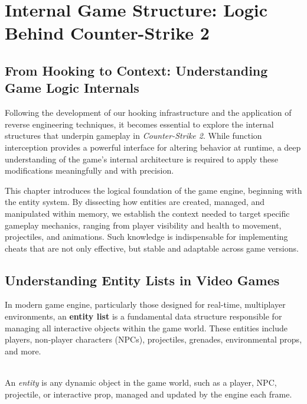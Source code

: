 \chapter{Internal Game Structure: Logic Behind Counter-Strike 2}

\section*{From Hooking to Context: Understanding Game Logic Internals}

Following the development of our hooking infrastructure and the application of reverse engineering techniques, it becomes essential to explore the internal structures that underpin gameplay in \textit{Counter-Strike 2}.  
While function interception provides a powerful interface for altering behavior at runtime, a deep understanding of the game’s internal architecture is required to apply these modifications meaningfully and with precision.

This chapter introduces the logical foundation of the game engine, beginning with the entity system.  
By dissecting how entities are created, managed, and manipulated within memory, we establish the context needed to target specific gameplay mechanics, ranging from player visibility and health to movement, projectiles, and animations.  
Such knowledge is indispensable for implementing cheats that are not only effective, but stable and adaptable across game versions.

\section{Understanding Entity Lists in Video Games}

In modern game engine, particularly those designed for real-time, multiplayer environments, an \textbf{entity list} is a fundamental data structure responsible for managing all interactive objects within the game world. These entities include players, non-player characters (NPCs), projectiles, grenades, environmental props, and more.

\begin{tcolorbox}[colback=gray!10, colframe=gray!50, sharp corners, boxrule=0pt]
 \\
An \textit{entity} is any dynamic object in the game world, such as a player, NPC, projectile, or interactive prop, managed and updated by the engine each frame.
\end{tcolorbox}

